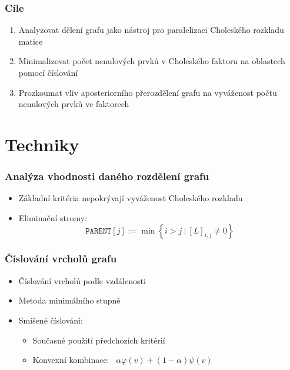 \documentclass{beamer}
\begin{document}
\begin{frame}
	\frametitle{Cíle}
  \begin{enumerate}
    \item Analyzovat dělení grafu jako nástroj pro paralelizaci Choleského rozkladu matice
    \medskip
    \item Minimalizovat počet nenulových prvků v Choleského faktoru na oblastech pomocí číslování
    \medskip
    \item Prozkoumat vliv aposteriorního přerozdělení grafu na vyváženost počtu nenulových prvků ve faktorech
  \end{enumerate}
\end{frame}

	\section{Techniky}
\begin{frame}
  \frametitle{Analýza vhodnosti daného rozdělení grafu}
  \begin{itemize}
    \item Základní kritéria nepokrývají vyváženost Choleského rozkladu
    \medskip
    \item Eliminační stromy:
    \[\texttt{PARENT}[j] := \min \left\{ i > j \ | \ [L]_{i,j} \neq 0\right\}
    \]
  \end{itemize}
\end{frame}


\begin{frame}
  \frametitle{Číslování vrcholů grafu}
  \begin{itemize}
    \item Číslování vrcholů podle vzdálenosti
    \medskip
    \item Metoda minimálního stupně
    \medskip
    \item Smíšené číslování:
    \medskip
    \begin{itemize}
      \item Současné použití předchozích kritérií
      \medskip
      \item Konvexní kombinace: \ $\alpha\varphi(v) + (1-\alpha)\psi(v)$
    \end{itemize}
  \end{itemize}
\end{frame}
\end{document}

